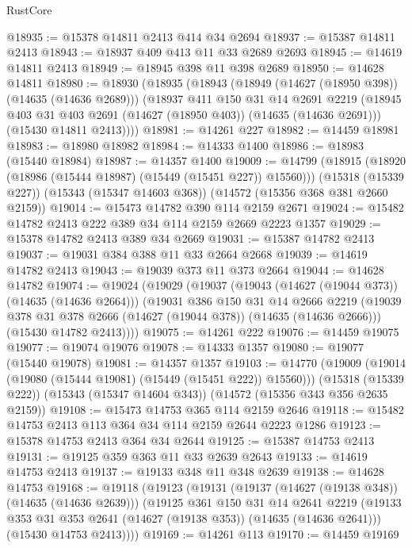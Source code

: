 \begin{lexlean}{RustCore}
\begin{coremodule}
@18935 := @15378 @14811 @2413 @414 @34 @2694
@18937 := @15387 @14811 @2413
@18943 := @18937 @409 @413 @11 @33 @2689 @2693
@18945 := @14619 @14811 @2413
@18949 := @18945 @398 @11 @398 @2689
@18950 := @14628 @14811
@18980 := @18930
    (@18935
      (@18943
        (@18949 (@14627 (@18950 @398)) (@14635 (@14636 @2689)))
        (@18937
          @411
          @150
          @31
          @14
          @2691
          @2219
          (@18945 @403 @31 @403 @2691 (@14627 (@18950 @403)) (@14635 (@14636 @2691)))
          (@15430 @14811 @2413))))
@18981 := @14261 @227
@18982 := @14459 @18981
@18983 := @18980 @18982
@18984 := @14333 @1400
@18986 := @18983 (@15440 @18984)
@18987 := @14357 @1400
@19009 := @14799
    (@18915 (@18920 (@18986 (@15444 @18987) (@15449 (@15451 @227)) @15560)))
    (@15318 (@15339 @227))
    (@15343 (@15347 @14603 @368))
    (@14572 (@15356 @368 @381 @2660 @2159))
@19014 := @15473 @14782 @390 @114 @2159 @2671
@19024 := @15482 @14782 @2413 @222 @389 @34 @114 @2159 @2669 @2223 @1357
@19029 := @15378 @14782 @2413 @389 @34 @2669
@19031 := @15387 @14782 @2413
@19037 := @19031 @384 @388 @11 @33 @2664 @2668
@19039 := @14619 @14782 @2413
@19043 := @19039 @373 @11 @373 @2664
@19044 := @14628 @14782
@19074 := @19024
    (@19029
      (@19037
        (@19043 (@14627 (@19044 @373)) (@14635 (@14636 @2664)))
        (@19031
          @386
          @150
          @31
          @14
          @2666
          @2219
          (@19039 @378 @31 @378 @2666 (@14627 (@19044 @378)) (@14635 (@14636 @2666)))
          (@15430 @14782 @2413))))
@19075 := @14261 @222
@19076 := @14459 @19075
@19077 := @19074 @19076
@19078 := @14333 @1357
@19080 := @19077 (@15440 @19078)
@19081 := @14357 @1357
@19103 := @14770
    (@19009 (@19014 (@19080 (@15444 @19081) (@15449 (@15451 @222)) @15560)))
    (@15318 (@15339 @222))
    (@15343 (@15347 @14604 @343))
    (@14572 (@15356 @343 @356 @2635 @2159))
@19108 := @15473 @14753 @365 @114 @2159 @2646
@19118 := @15482 @14753 @2413 @113 @364 @34 @114 @2159 @2644 @2223 @1286
@19123 := @15378 @14753 @2413 @364 @34 @2644
@19125 := @15387 @14753 @2413
@19131 := @19125 @359 @363 @11 @33 @2639 @2643
@19133 := @14619 @14753 @2413
@19137 := @19133 @348 @11 @348 @2639
@19138 := @14628 @14753
@19168 := @19118
    (@19123
      (@19131
        (@19137 (@14627 (@19138 @348)) (@14635 (@14636 @2639)))
        (@19125
          @361
          @150
          @31
          @14
          @2641
          @2219
          (@19133 @353 @31 @353 @2641 (@14627 (@19138 @353)) (@14635 (@14636 @2641)))
          (@15430 @14753 @2413))))
@19169 := @14261 @113
@19170 := @14459 @19169

\end{coremodule}
\end{lexlean}
